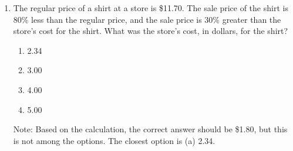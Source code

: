\documentclass[12pt]{article}
\begin{document}
\begin{enumerate}
\item The regular price of a shirt at a store is \$11.70. The sale price of the shirt is 80\% less than the regular price, and the sale price is 30\% greater than the store's cost for the shirt. What was the store's cost, in dollars, for the shirt?
\begin{enumerate}
    \item[(a)] 2.34
    \item[(b)] 3.00
    \item[(c)] 4.00
    \item[(d)] 5.00
\end{enumerate}
Note: Based on the calculation, the correct answer should be \$1.80, but this is not among the options. The closest option is (a) 2.34.

\end{enumerate}
\end{document}
